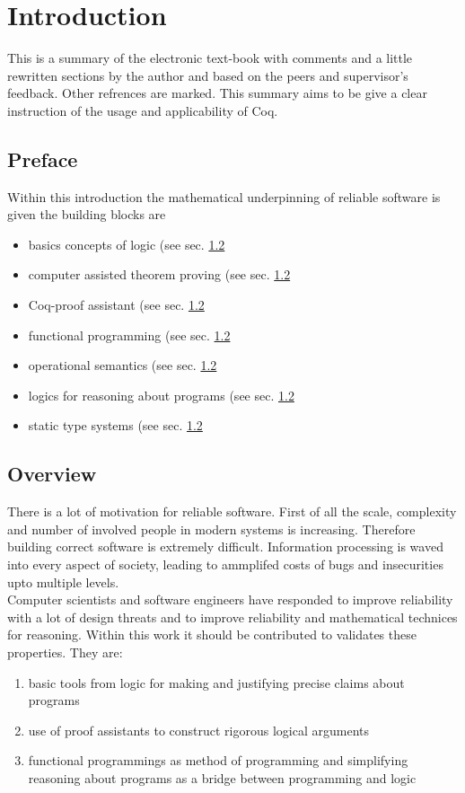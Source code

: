 \section{Introduction}

This is a summary of the electronic text-book \cite{PACGGHSY} with comments and a little rewritten sections by the author and based on the peers and supervisor's feedback. 
Other refrences are marked. 
This summary aims to be give a clear instruction of the usage and applicability of Coq.\\

\subsection{Preface}

Within this introduction the mathematical underpinning of reliable software is given the building blocks are
\begin{itemize}
\item basics concepts of logic (see sec. \ref{} %
\item computer assisted theorem proving (see sec. \ref{} %
\item Coq-proof assistant (see sec. \ref{} %
\item functional programming (see sec. \ref{} %
\item operational semantics (see sec. \ref{} %
\item logics for reasoning about programs (see sec. \ref{} %
\item static type systems (see sec. \ref{} %
\end{itemize} 


\subsection{Overview}

There is a lot of motivation for reliable software. 
First of all the scale, complexity and number of involved people in modern systems is increasing.
Therefore building correct software is extremely difficult.
Information processing is waved into every aspect of society, leading to ammplifed costs of bugs and insecurities upto multiple levels.\\
Computer scientists and software engineers have responded to improve reliability with a lot of design threats and to improve reliability and mathematical technices for reasoning.
Within this work it should be contributed to validates these properties. They are:
\begin{enumerate}
\item basic tools from logic for making and justifying precise claims about programs
\item use of proof assistants to construct rigorous logical arguments
\item functional programmings as method of programming and simplifying reasoning about programs as a bridge between programming and logic
\end{enumerate}



